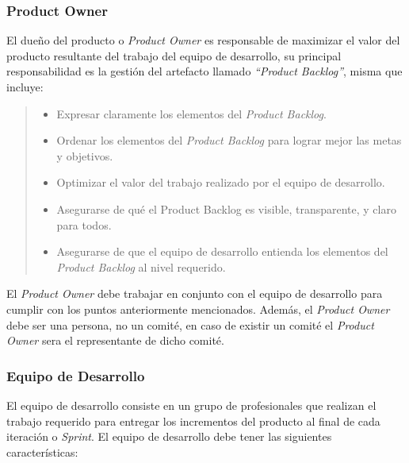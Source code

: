 \subsubsection{Product Owner} 

 \noindent El dueño del producto o {\em Product Owner} es responsable de maximizar el valor
 del producto resultante del trabajo del equipo de desarrollo, su principal responsabilidad
 es la gestión del artefacto llamado {\em``Product Backlog''}, misma que incluye:
   
    \begin{quote}
    \begin{itemize}
        \item Expresar claramente los elementos del {\it Product Backlog}.
        \item Ordenar los elementos del {\it Product Backlog} para lograr mejor las metas y objetivos.
        \item Optimizar el valor del trabajo realizado por el equipo de desarrollo.
        \item Asegurarse de qué el Product Backlog es visible, transparente, y claro para todos.
        \item Asegurarse de que el equipo de desarrollo entienda los elementos del {\it Product Backlog}
                al nivel requerido.\\
    \end{itemize}
    \end{quote}
    
 \noindent El {\it Product Owner} debe trabajar en conjunto con el equipo de desarrollo para cumplir con
 los puntos anteriormente mencionados. Además, el {\it Product Owner} debe ser una persona, no un comité,
 en caso de existir un comité el {\it Product Owner} sera el representante de dicho comité.
    
\subsubsection{Equipo de Desarrollo}

 El equipo de desarrollo consiste en un grupo de profesionales que realizan el trabajo requerido para
 entregar los incrementos del producto al final de cada iteración o {\it Sprint}. El equipo de desarrollo
 debe tener las siguientes características:
    

